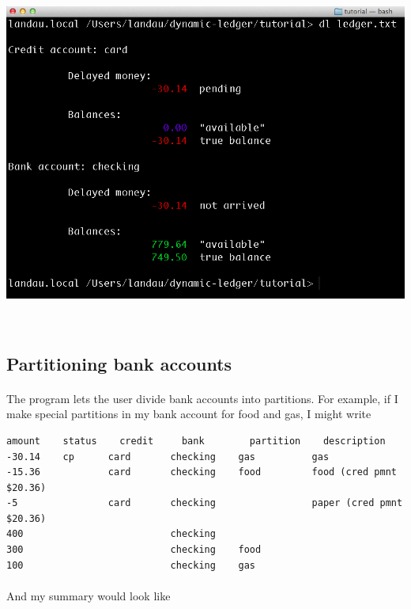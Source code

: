 \documentclass{article}
\providecommand{\q}{$\quad$ \newline}
\begin{document}
\begin{flushleft}
\begin{center}
\includegraphics[scale=.45]{fig/sum7.png}
\end{center} \q



\subsection{Partitioning bank accounts}

\paragraph{} The program lets the user divide bank accounts into partitions. For example, if I make special partitions in my bank account for food and gas, I might write

\begin{lstlisting}[title=ledger.txt]
amount    status	credit     bank        partition    description
-30.14    cp      card       checking    gas          gas
-15.36            card       checking    food         food (cred pmnt $20.36)
-5                card       checking                 paper (cred pmnt $20.36)
400                          checking    
300                          checking    food
100                          checking    gas
\end{lstlisting}

\paragraph{} And my summary would look like 


\end{flushleft}
\end{document}
